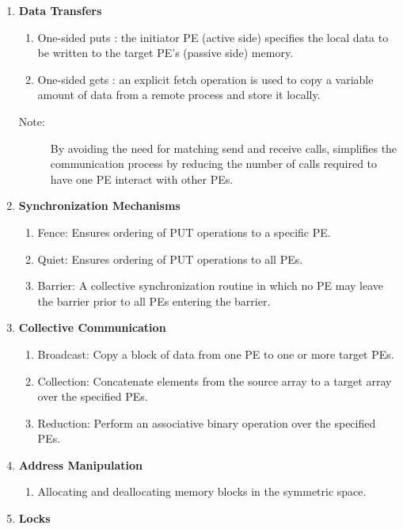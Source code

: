 \begin{enumerate}
\item \textbf{Data Transfers }

\begin{enumerate}
\item One-sided puts : the initiator \ac{PE} (active side) specifies the local
data to be written to the target \ac{PE}'s (passive side) memory. 
\item One-sided gets : an explicit fetch operation is used to copy a variable
amount of data from a remote process and store it locally.\end{enumerate}
\begin{description}
\item [{{Note:}}] By avoiding the need for matching send and receive
calls, \openshmem simplifies the communication process by reducing the
number of calls required to have one \ac{PE} interact with other \ac{PE}s. 
\end{description}
\item \textbf{Synchronization Mechanisms }

\begin{enumerate}
\item Fence: Ensures ordering of PUT operations to a specific \ac{PE}. 
\item Quiet: Ensures ordering of PUT operations to all \ac{PE}s. 
\item Barrier: A collective synchronization routine in which no \ac{PE} may leave
the barrier prior to all \ac{PE}s entering the barrier. 
\end{enumerate}
\item \textbf{Collective Communication}

\begin{enumerate}
\item Broadcast: Copy a block of data from one \ac{PE} to one or more target
PEs. 
\item Collection: Concatenate elements from the source array to a target
array over the specified \ac{PE}s. 
\item Reduction: Perform an associative binary operation over the specified
\ac{PE}s. 
\end{enumerate}
\item \textbf{Address Manipulation}

\begin{enumerate}
\item Allocating and deallocating memory blocks in the symmetric space.
\end{enumerate}
\item \textbf{Locks}


\end{enumerate}
